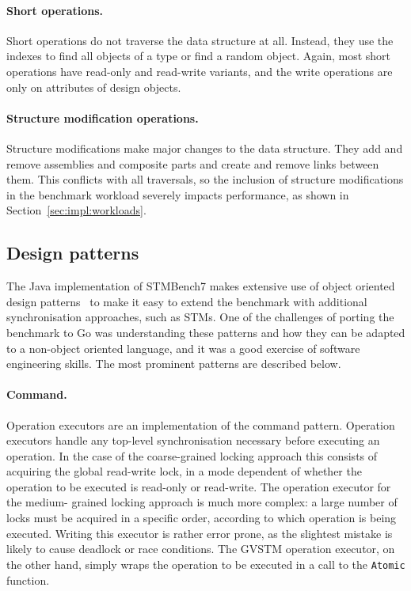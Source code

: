 \documentclass[12pt,a4paper,oneside,openright]{report}
\newcommand{\goFunc}[1]{\texttt{#1}}
\begin{document}
\paragraph{Short operations.} Short operations do not traverse the
data structure at all. Instead, they use the indexes to find all
objects of a type or find a random object. Again, most short
operations have read-only and read-write variants, and the write
operations are only on attributes of design objects.

\paragraph{Structure modification operations.} Structure modifications
make major changes to the data structure. They add and remove
assemblies and composite parts and create and remove links between
them. This conflicts with all traversals, so the inclusion of
structure modifications in the benchmark workload severely impacts
performance, as shown in Section~\ref{sec:impl:workloads}.

\subsection{Design patterns}
\label{sec:impl:design-patterns}

The Java implementation of STMBench7 makes extensive use of object
oriented design patterns~\cite{GoF} to make it easy to extend the
benchmark with additional synchronisation approaches, such as
STMs. One of the challenges of porting the benchmark to Go was
understanding these patterns and how they can be adapted to a
non-object oriented language, and it was a good exercise of software
engineering skills. The most prominent patterns are described below.

\paragraph{Command.} Operation executors are an implementation of the
command pattern. Operation executors handle any top-level
synchronisation necessary before executing an operation. In the case
of the coarse-grained locking approach this consists of acquiring the
global read-write lock, in a mode dependent of whether the operation
to be executed is read-only or read-write. The operation executor for
the medium- grained locking approach is much more complex: a large
number of locks must be acquired in a specific order, according to
which operation is being executed. Writing this executor is rather
error prone, as the slightest mistake is likely to cause deadlock or
race conditions. The GVSTM operation executor, on the other hand,
simply wraps the operation to be executed in a call to the
\goFunc{Atomic} function.
\end{document}
